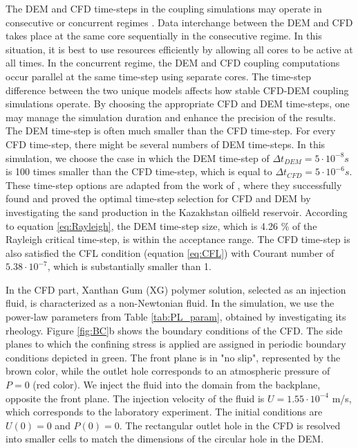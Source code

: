 \documentclass{article}
\begin{document}

The DEM and CFD time-steps in the coupling simulations may operate in consecutive or concurrent regimes \citep{kloss2012models}. Data interchange between the DEM and CFD takes place at the same core sequentially in the consecutive regime. In this situation, it is best to use resources efficiently by allowing all cores to be active at all times. In the concurrent regime, the DEM and CFD coupling computations occur parallel at the same time-step using separate cores. The time-step difference between the two unique models affects how stable CFD-DEM coupling simulations operate. By choosing the appropriate CFD and DEM time-steps, one may manage the simulation duration and enhance the precision of the results. The DEM time-step is often much smaller than the CFD time-step. For every CFD time-step, there might be several numbers of DEM time-steps. In this simulation, we choose the case in which the DEM time-step of $\Delta t_{DEM} = 5 \cdot 10^{-8} s $ is 100 times smaller than the CFD time-step, which is equal to $\Delta t_{CFD} = 5 \cdot 10^{-6} s $. These time-step options are adapted from the work of \cite{kazidenov2023time}, where they successfully found and proved the optimal time-step selection for CFD and DEM by investigating the sand production in the Kazakhstan oilfield reservoir. According to equation \ref{eq:Rayleigh}, the DEM time-step size, which is 4.26 \% of the Rayleigh critical time-step, is within the acceptance range. The CFD time-step is also satisfied the CFL condition (equation \ref{eq:CFL}) with Courant number of $5.38 \cdot 10^{-7}$, which is substantially smaller than 1.


In the CFD part, Xanthan Gum (XG) polymer solution, selected as an injection fluid, is characterized as a non-Newtonian fluid. In the simulation, we use the power-law parameters from Table \ref{tab:PL_param}, obtained by investigating its rheology. Figure \ref{fig:BC}b shows the boundary conditions of the CFD. The side planes to which the confining stress is applied are assigned in periodic boundary conditions depicted in green. The front plane is in "no slip", represented by the brown color, while the outlet hole corresponds to an atmospheric pressure of $P = 0$ (red color). We inject the fluid into the domain from the backplane, opposite the front plane. The injection velocity of the fluid is $U = 1.55 \cdot 10^{-4}$ m/s, which corresponds to the laboratory experiment. The initial conditions are $U(0) = 0$ and  $P(0) = 0$. The rectangular outlet hole in the CFD is resolved into smaller cells to match the dimensions of the circular hole in the DEM.
\end{document}
